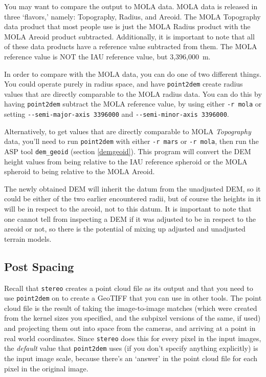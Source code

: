 You may want to compare the output to MOLA data.  MOLA data is
released in three `flavors,' namely: Topography, Radius, and Areoid.
The MOLA Topography data product that most people use is just the MOLA Radius
product with the MOLA Areoid product subtracted.  Additionally, it is
important to note that all of these data products have a reference
value subtracted from them.  The MOLA reference value is NOT the
IAU reference value, but 3,396,000~m.

In order to compare with the MOLA data, you can do one of two different
things.  You could operate purely in radius space, and have
\texttt{point2dem} create radius values that are directly comparable to
the MOLA radius data.  You can do this by having \texttt{point2dem}
subtract the MOLA reference value, by using either \texttt{-r
mola} or setting \texttt{-\/-semi-major-axis 3396000} and
\texttt{-\/-semi-minor-axis 3396000}.

Alternatively, to get values that are directly comparable to MOLA
\textit{Topography} data, you'll need to run \texttt{point2dem} with
either \texttt{-r mars} or \texttt{-r mola}, then run the ASP tool
\texttt{dem\_geoid} (section \ref{demgeoid}). This program will convert
the DEM height values from being relative to the IAU reference spheroid
or the MOLA spheroid to being relative to the MOLA Areoid.

The newly obtained DEM will inherit the datum from the unadjusted DEM,
so it could be either of the two earlier encountered radii, but of
course the heights in it will be in respect to the areoid, not to this
datum. It is important to note that one cannot tell from inspecting a
DEM if it was adjusted to be in respect to the areoid or not, so there is
the potential of mixing up adjusted and unadjusted terrain models.

\subsection{Post Spacing}
\label{post-spacing}

Recall that \texttt{stereo} creates a point cloud file as its output
and that you need to use \texttt{point2dem} on to create a GeoTIFF that
you can use in other tools.  The point cloud file is the result of
taking the image-to-image matches (which were created from the
kernel sizes you specified, and the subpixel versions of the same,
if used) and projecting them out into space from the cameras, and
arriving at a point in real world coordinates.  Since \texttt{stereo} does
this for every pixel in the input images, the \emph{default} value that
\texttt{point2dem} uses (if you don't specify anything explicitly) is the
input image scale, because there's an `answer' in the point cloud
file for each pixel in the original image.

